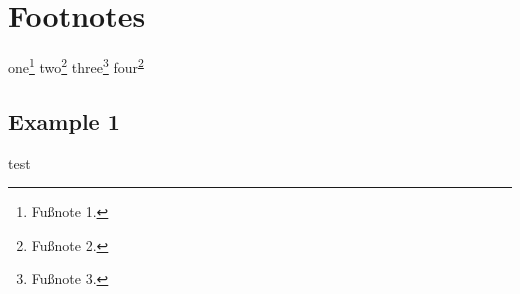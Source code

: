 \chapter{Footnotes}

one\footnote{\label{foot-1} Fußnote 1.}
two\footnote{\label{foot-2}Fußnote 2.}
three\footnote{\label{foot-3}Fußnote 3.}
four\textsuperscript{\ref{foot-2}}

\section{Example 1}
test